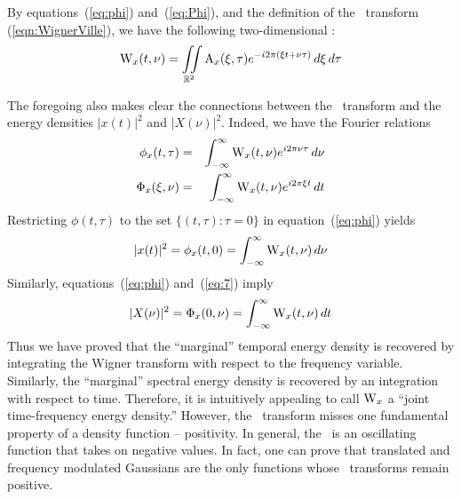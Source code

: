 By equations~(\ref{eq:phi}) and~(\ref{eq:Phi}), and the definition of
the \WV\ transform (\ref{eqn:WignerVille}), 
we have the following two-dimensional \FT: 
\begin{equation}\label{eq:ambig-ft}
\operatorname{W}_x(t,\nu) = 
  \iint\limits_{\mathbb{R}^2} 
    \operatorname{A}_x(\xi,\tau) e^{-i2\pi(\xi t + \nu\tau)}\,d\xi\,d\tau
\end{equation}

The foregoing also makes clear the connections between the \WV\
transform and the energy densities $|x(t)|^2$ and $|X(\nu)|^2$.
Indeed, we have the Fourier relations
\begin{eqnarray}
\phi_x(t,\tau) &=& 
    \int_{-\infty}^{\infty} \operatorname{W}_x(t,\nu) e^{i2\pi\nu \tau}\,d\nu\nonumber \\
\Phi_x(\xi,\nu) &=& 
    \int_{-\infty}^{\infty} \operatorname{W}_x(t,\nu) e^{i2\pi\xi t}\,dt\label{eq:7}
\end{eqnarray}
Restricting $\phi(t,\tau)$ to the set $\{(t,\tau): \tau=0\}$ in 
equation~(\ref{eq:phi}) yields
\[%
|x(t)|^2 =\phi_x(t,0) = \integral \W_x(t,\nu)\,d\nu
\]%
Similarly, %
equations~(\ref{eq:phi}) and~(\ref{eq:7}) imply
\[%
|X(\nu)|^2 =\Phi_x(0,\nu)= \integral \W_x(t,\nu)\,dt
\]%
Thus we have proved that the ``marginal'' temporal energy density is
recovered by integrating the Wigner transform with respect to the
frequency variable.  Similarly, the ``marginal'' spectral energy
density is recovered by an integration with respect to time. 
Therefore, it is intuitively appealing to call $\operatorname{W}_x$ a ``joint
time-frequency energy density.''  
However, the \WV\ transform misses one fundamental property of a density
function -- positivity.  In general, the \WV\ is an oscillating
function that takes on negative values.  In fact, one can prove that
translated and frequency modulated Gaussians are the only functions
whose \WV\ transforms remain positive. 


